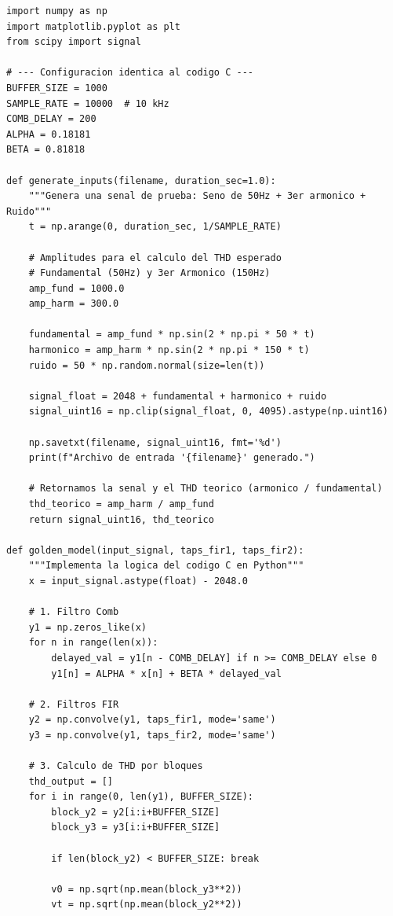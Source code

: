 \vspace{0.5cm}
\begin{lstlisting}[style=mystyle, caption={Código empleado para generar input \& golden.}, label={lst:filtro + ds}]
import numpy as np
import matplotlib.pyplot as plt
from scipy import signal

# --- Configuracion identica al codigo C ---
BUFFER_SIZE = 1000
SAMPLE_RATE = 10000  # 10 kHz
COMB_DELAY = 200
ALPHA = 0.18181
BETA = 0.81818

def generate_inputs(filename, duration_sec=1.0):
    """Genera una senal de prueba: Seno de 50Hz + 3er armonico + Ruido"""
    t = np.arange(0, duration_sec, 1/SAMPLE_RATE)
    
    # Amplitudes para el calculo del THD esperado
    # Fundamental (50Hz) y 3er Armonico (150Hz)
    amp_fund = 1000.0
    amp_harm = 300.0
    
    fundamental = amp_fund * np.sin(2 * np.pi * 50 * t)
    harmonico = amp_harm * np.sin(2 * np.pi * 150 * t)
    ruido = 50 * np.random.normal(size=len(t))
    
    signal_float = 2048 + fundamental + harmonico + ruido
    signal_uint16 = np.clip(signal_float, 0, 4095).astype(np.uint16)
    
    np.savetxt(filename, signal_uint16, fmt='%d')
    print(f"Archivo de entrada '{filename}' generado.")
    
    # Retornamos la senal y el THD teorico (armonico / fundamental)
    thd_teorico = amp_harm / amp_fund
    return signal_uint16, thd_teorico

def golden_model(input_signal, taps_fir1, taps_fir2):
    """Implementa la logica del codigo C en Python"""
    x = input_signal.astype(float) - 2048.0
    
    # 1. Filtro Comb
    y1 = np.zeros_like(x)
    for n in range(len(x)):
        delayed_val = y1[n - COMB_DELAY] if n >= COMB_DELAY else 0
        y1[n] = ALPHA * x[n] + BETA * delayed_val
        
    # 2. Filtros FIR
    y2 = np.convolve(y1, taps_fir1, mode='same')
    y3 = np.convolve(y1, taps_fir2, mode='same')
    
    # 3. Calculo de THD por bloques
    thd_output = []
    for i in range(0, len(y1), BUFFER_SIZE):
        block_y2 = y2[i:i+BUFFER_SIZE]
        block_y3 = y3[i:i+BUFFER_SIZE]
        
        if len(block_y2) < BUFFER_SIZE: break
        
        v0 = np.sqrt(np.mean(block_y3**2))
        vt = np.sqrt(np.mean(block_y2**2))
        

\end{lstlisting}
